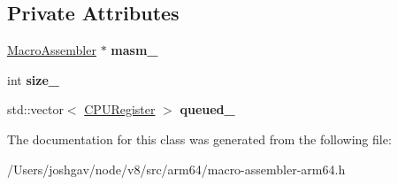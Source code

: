 \subsection*{Private Attributes}
\begin{DoxyCompactItemize}
\item 
\hyperlink{classv8_1_1internal_1_1_macro_assembler}{Macro\+Assembler} $\ast$ {\bfseries masm\+\_\+}\hypertarget{classv8_1_1internal_1_1_macro_assembler_1_1_push_pop_queue_a65f145c3c495c42b3477f3a48772be61}{}\label{classv8_1_1internal_1_1_macro_assembler_1_1_push_pop_queue_a65f145c3c495c42b3477f3a48772be61}

\item 
int {\bfseries size\+\_\+}\hypertarget{classv8_1_1internal_1_1_macro_assembler_1_1_push_pop_queue_a319469ac5ead0ee1040b57df3fdb3d3b}{}\label{classv8_1_1internal_1_1_macro_assembler_1_1_push_pop_queue_a319469ac5ead0ee1040b57df3fdb3d3b}

\item 
std\+::vector$<$ \hyperlink{structv8_1_1internal_1_1_c_p_u_register}{C\+P\+U\+Register} $>$ {\bfseries queued\+\_\+}\hypertarget{classv8_1_1internal_1_1_macro_assembler_1_1_push_pop_queue_a2006eb1097bc0acc1172f15f420e87c0}{}\label{classv8_1_1internal_1_1_macro_assembler_1_1_push_pop_queue_a2006eb1097bc0acc1172f15f420e87c0}

\end{DoxyCompactItemize}


The documentation for this class was generated from the following file\+:\begin{DoxyCompactItemize}
\item 
/\+Users/joshgav/node/v8/src/arm64/macro-\/assembler-\/arm64.\+h\end{DoxyCompactItemize}
